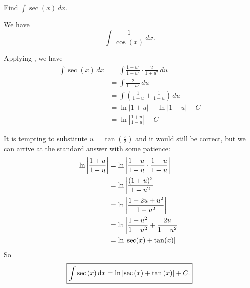 \begin{example}
    Find \( \int \sec(x) \, dx \).
    
    We have 
    \[ \int \frac{1}{\cos(x)} \, dx. \]
    
    Applying , we have  
    \begin{align*}
        \int \sec(x) \, dx &= \int \frac{1+u^{2}}{1-u^{2}} \cdot \frac{2}{1 +u^2} \, du \\
        &= \int \frac{2}{1-u^{2}} \, du\\
        &= \int \left(\frac{1}{1+u} + \frac{1}{1-u}\right) \, du\\
        &= \ln|1+u| - \ln|1-u| + C \\
        &= \ln\left|\frac{1+u}{1-u}\right| + C
    \end{align*}
    
    It is tempting to substitute \( u = \tan\left(\frac{x}{2}\right) \) and it would still be correct, but we can arrive at the standard answer with some patience: 
    \begin{align*}
         \ln\left|\frac{1+u}{1-u}\right| &= \ln\left|\frac{1+u}{1-u} \cdot \frac{1+u}{1+u}\right|\\
         &= \ln\left|\frac{(1 +u)^{2}}{1-u^{2}}\right|\\
         &= \ln\left|\frac{1+2u+u^{2}}{1-u^{2}}\right|\\
         &= \ln\left|\frac{1+u^{2}}{1-u^{2}} + \frac{2u}{1-u^{2}}\right|\\
         &= \ln \abs{\sec(x) + \tan(x)}
    \end{align*}
So 
\[ \boxed{ \int \sec \left( x  \right) \dd{x} = \ln \abs{\sec \left( x  \right) + \tan{ \left( x  \right) }} +C.} \]
\end{example}


